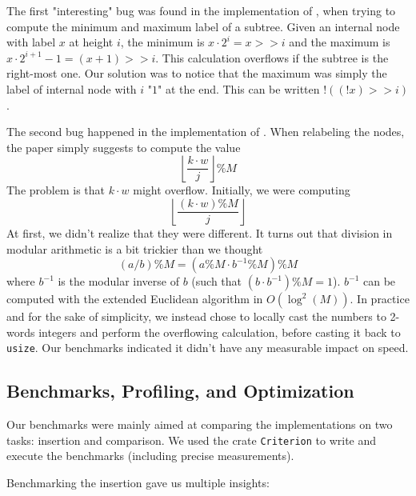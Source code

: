 \documentclass[12pt]{article}
\begin{document}
The first "interesting" bug was found in the implementation of \cite{10.5555/647912.740822}, when trying to compute the minimum and maximum label of a subtree. Given an internal node with label $x$ at height $i$, the minimum is $x \cdot 2^i = x >> i$ and the maximum is $x \cdot 2^{i+1} - 1 = (x + 1) >> i$. This calculation overflows if the subtree is the right-most one. Our solution was to notice that the maximum was simply the label of internal node with $i$ "$1$" at the end. This can be written $!((!x) >> i) $.

The second bug happened in the implementation of \cite{10.1145/28395.28434}. When relabeling the nodes, the paper simply suggests to compute the value
$$\left\lfloor \frac{k \cdot w}{j} \right\rfloor \% M$$
The problem is that  $k\cdot w$ might overflow. Initially, we were computing
$$\left\lfloor \frac{(k \cdot w) \% M}{j} \right\rfloor$$
At first, we didn't realize that they were different. It turns out that division in modular arithmetic is a bit trickier than we thought
$$(a/b)\%M = (a\%M \cdot b^{-1}\%M)\%M $$
where $b^{-1}$ is the modular inverse of $b$ (such that $(b \cdot b^{-1}) \%M = 1$).
$b^{-1}$ can be computed with the extended Euclidean algorithm in $O(\log^2(M))$. In practice and for the sake of simplicity, we instead chose to locally cast the numbers to 2-words integers and perform the overflowing calculation, before casting it back to \texttt{usize}. Our benchmarks indicated it didn't have any measurable impact on speed.

\subsection{Benchmarks, Profiling, and Optimization}

Our benchmarks were mainly aimed at comparing the implementations on two tasks: insertion and comparison. We used the crate \texttt{Criterion} to write and execute the benchmarks (including precise measurements).

Benchmarking the insertion gave us multiple insights:
\end{document}
